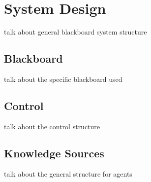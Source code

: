 \section{System Design}

talk about general blackboard system structure

\subsection{Blackboard}

talk about the specific blackboard used

\subsection{Control}

talk about the control structure

\subsection{Knowledge Sources}

talk about the general structure for agents
